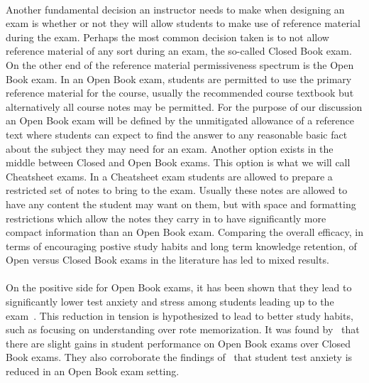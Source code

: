 \documentclass[12pt]{article}
\begin{document}
\paragraph{}
Another fundamental decision an instructor needs to make when designing an exam is whether or not they will allow students to make use of reference material during the exam. Perhaps the most common decision taken is to not allow reference material of any sort during an exam, the so-called Closed Book exam. On the other end of the reference material permissiveness spectrum is the Open Book exam. In an Open Book exam, students are permitted to use the primary reference material for the course, usually the recommended course textbook but alternatively all course notes may be permitted. For the purpose of our discussion an Open Book exam will be defined by the unmitigated allowance of a reference text where students can expect to find the answer to any reasonable basic fact about the subject they may need for an exam. Another option exists in the middle between Closed and Open Book exams. This option is what we will call Cheatsheet exams. In a Cheatsheet exam students are allowed to prepare a restricted set of notes to bring to the exam. Usually these notes are allowed to have any content the student may want on them, but with space and formatting restrictions which allow the notes they carry in to have significantly more compact information than an Open Book exam. Comparing the overall efficacy, in terms of encouraging postive study habits and long term knowledge retention, of Open versus Closed Book exams in the literature has led to mixed results.
\paragraph{}
On the positive side for Open Book exams, it has been shown that they lead to significantly lower test anxiety and stress among students leading up to the exam~\cite{broyles2005open}. This reduction in tension is hypothesized to lead to better study habits, such as focusing on understanding over rote memorization. It was found by~\cite{broyles2005open} that there are slight gains in student performance on Open Book exams over Closed Book exams. They also corroborate the findings of~\cite{broyles2005open} that student test anxiety is reduced in an Open Book exam setting. 
\end{document}
